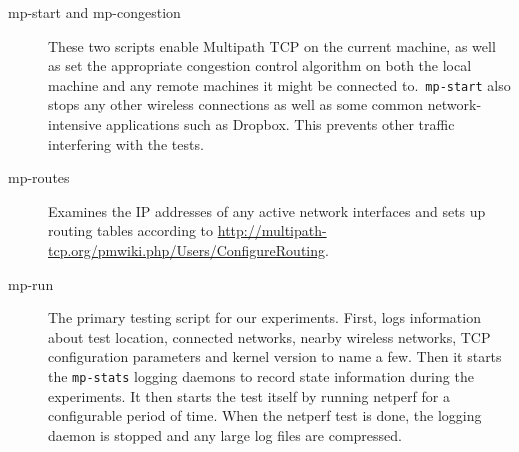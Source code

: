 \begin{description}
  \item[mp-start and mp-congestion]
    These two scripts enable Multipath TCP on the current machine, as well as set the
    appropriate congestion control algorithm on both the local machine and any
    remote machines it might be connected to.\ \texttt{mp-start} also stops any
    other wireless connections as well as some common network-intensive
    applications such as Dropbox. This prevents other traffic interfering with
    the tests.
  \item[mp-routes]
    Examines the IP addresses of any active network interfaces and sets up
    routing tables according to
    \href{http://multipath-tcp.org/pmwiki.php/Users/ConfigureRouting}{http://multipath-tcp.org/\-pmwiki.php/\-Users/\-ConfigureRouting}.
  \item[mp-run]
    The primary testing script for our experiments. First, logs information
    about test location, connected networks, nearby wireless networks, TCP
    configuration parameters and kernel version to name a few. Then it starts
    the \texttt{mp-stats} logging daemons to record state information during the
    experiments. It then starts the test itself by running netperf for a
    configurable period of time. When the netperf test is done, the logging
    daemon is stopped and any large log files are compressed.


\end{description}
